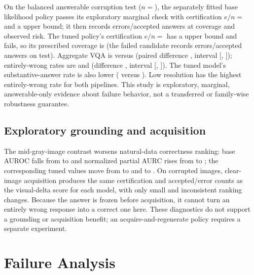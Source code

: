 \documentclass[11pt]{article}
\newcommand{\BaseAURC}{}
\newcommand{\TunedAURC}{}
\newcommand{\BaseAUROC}{}
\newcommand{\TunedAUROC}{}
\newcommand{\BaseVisualAURC}{}
\newcommand{\TunedVisualAURC}{}
\newcommand{\BaseVisualAUROC}{}
\newcommand{\TunedVisualAUROC}{}
\newcommand{\ShiftN}{}
\newcommand{\BaseShiftVQA}{}
\newcommand{\TunedShiftVQA}{}
\newcommand{\BaseShiftWrongRate}{}
\newcommand{\TunedShiftWrongRate}{}
\newcommand{\BaseShiftSubstantiveRate}{}
\newcommand{\TunedShiftSubstantiveRate}{}
\newcommand{\ShiftVQADelta}{}
\newcommand{\ShiftVQADeltaLow}{}
\newcommand{\ShiftVQADeltaHigh}{}
\newcommand{\ShiftWrongDelta}{}
\newcommand{\ShiftWrongDeltaLow}{}
\newcommand{\ShiftWrongDeltaHigh}{}
\newcommand{\BaseShiftCertErrorsAccepted}{}
\newcommand{\TunedShiftCertErrorsAccepted}{}
\newcommand{\BaseShiftCertUpper}{}
\newcommand{\TunedShiftCertUpper}{}
\newcommand{\BaseShiftTestErrorsAccepted}{}
\newcommand{\BaseShiftTestCoverage}{}
\newcommand{\TunedShiftTestCoverage}{}
\newcommand{\BaseShiftTestRisk}{}
\newcommand{\TunedShiftCandidateErrorsAccepted}{}
\begin{document}
On the balanced answerable corruption test ($n=\ShiftN$), the separately fitted base
likelihood policy passes its exploratory marginal check with certification
$e/n=\BaseShiftCertErrorsAccepted{}$ and a \BaseShiftCertUpper{} upper
bound; it then records \BaseShiftTestErrorsAccepted{} errors/accepted answers at
\BaseShiftTestCoverage{} coverage and \BaseShiftTestRisk{} observed risk.  The tuned
policy's certification $e/n=\TunedShiftCertErrorsAccepted{}$ has a
\TunedShiftCertUpper{} upper
bound and fails, so its prescribed coverage is \TunedShiftTestCoverage{} (the failed
candidate records \TunedShiftCandidateErrorsAccepted{} errors/accepted answers on
test).  Aggregate VQA
is \BaseShiftVQA{} versus \TunedShiftVQA{} (paired difference \ShiftVQADelta{},
interval [\ShiftVQADeltaLow{}, \ShiftVQADeltaHigh{}]); entirely-wrong rates are
\BaseShiftWrongRate{} and \TunedShiftWrongRate{} (difference \ShiftWrongDelta{},
interval [\ShiftWrongDeltaLow{}, \ShiftWrongDeltaHigh{}]).  The tuned model's
substantive-answer rate is also lower (\TunedShiftSubstantiveRate{} versus
\BaseShiftSubstantiveRate{}).  Low resolution has the highest entirely-wrong rate
for both pipelines.  This study is
exploratory, marginal, answerable-only evidence about failure behavior, not a
transferred or family-wise robustness guarantee.

\subsection{Exploratory grounding and acquisition}

The mid-gray-image contrast worsens natural-data correctness ranking: base AUROC
falls from \BaseAUROC{} to \BaseVisualAUROC{} and normalized partial AURC rises from
\BaseAURC{} to \BaseVisualAURC{}; the corresponding tuned values move from
\TunedAUROC{} to \TunedVisualAUROC{} and \TunedAURC{} to \TunedVisualAURC{}.
On corrupted images, clear-image acquisition produces the same certification and
accepted/error counts as the visual-delta score for each model, with only small and
inconsistent ranking changes.  Because the answer is frozen before acquisition, it
cannot turn an entirely wrong response into a correct one here.  These diagnostics
do not support a grounding or acquisition benefit; an acquire-and-regenerate policy
requires a separate experiment.

\section{Failure Analysis}
\end{document}
